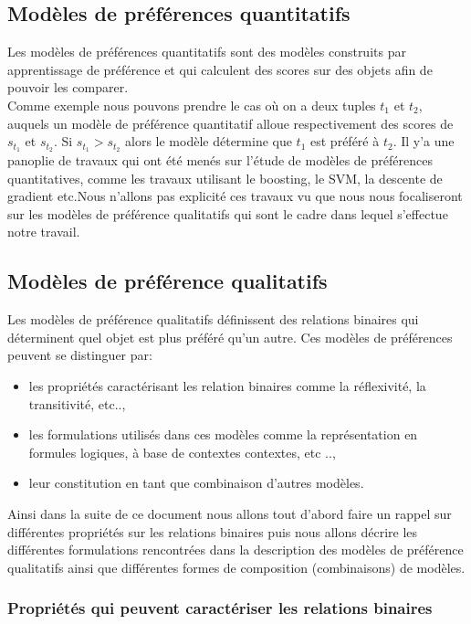 \documentclass[a4paper,12pt,openany,oneside]{article}
\begin{document}
\subsection{Modèles de préférences quantitatifs} 
Les modèles de préférences quantitatifs sont des modèles construits par apprentissage de préférence et qui calculent des scores sur des objets afin de pouvoir les comparer. \\
Comme exemple nous pouvons prendre le cas où on a deux tuples $t_1$ et $t_2$, auquels un modèle de préférence quantitatif alloue respectivement des scores de $s_{t_1}$ et $s_{t_2}$. Si $s_{t_1}>s_{t_2}$ alors le modèle détermine que $t_1$ est préféré à $t_2$.
Il y'a une panoplie de travaux qui ont été menés sur l'étude de modèles de préférences quantitatives, comme les travaux utilisant le boosting, le SVM, la descente de gradient etc.Nous n'allons pas explicité ces travaux vu que nous nous focaliseront sur les modèles de préférence qualitatifs qui sont le cadre dans lequel s'effectue notre travail.

\subsection{Modèles de préférence qualitatifs}
Les modèles de préférence qualitatifs définissent des relations binaires qui déterminent quel objet est plus préféré qu'un autre. Ces modèles de préférences peuvent se distinguer par:
\begin{itemize}
\item les propriétés caractérisant les relation binaires comme la réflexivité, la transitivité, etc..,
\item  les formulations utilisés dans ces modèles comme la représentation en formules logiques, à base de contextes contextes, etc ..,
\item  leur constitution en tant que combinaison d'autres modèles.
\end{itemize}
 Ainsi dans la suite de ce document nous allons tout d'abord faire un rappel sur différentes propriétés sur les relations binaires puis nous allons décrire les différentes formulations rencontrées dans la description des modèles de préférence qualitatifs ainsi que différentes formes de composition (combinaisons) de modèles.

\subsubsection{Propriétés qui peuvent caractériser les relations binaires}
\end{document}
